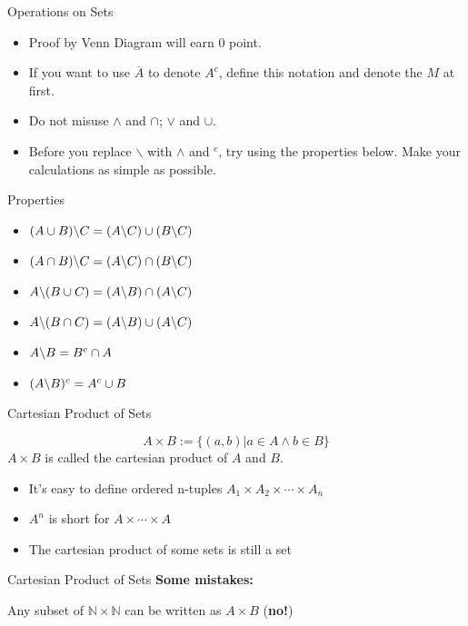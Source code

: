 \begin{frame}{Operations on Sets}
    \begin{itemize}
        \item Proof by Venn Diagram will earn 0 point.
        \item If you want to use $\overline{A}$ to denote $A^c$, define this notation and denote the $M$ at first.
        \item Do not misuse $\wedge$ and $\cap$; $\vee$ and $\cup$.
        \item Before you replace $\backslash$ with $\wedge$ and $^c$, try using the properties below. Make your calculations as simple as possible.
    \end{itemize}
    \begin{block}{Properties}
    \begin{itemize}
        \item $(A\cup B)\backslash C=(A\backslash C)\cup(B\backslash C)$
        \item $(A\cap B)\backslash C=(A\backslash C)\cap(B\backslash C)$
        \item $A\backslash (B\cup C)=(A\backslash B)\cap(A\backslash C)$
        \item $A\backslash (B\cap C)=(A\backslash B)\cup(A\backslash C)$
        \item $A\backslash B=B^c\cap A$
        \item $(A\backslash B)^c=A^c\cup B$
    \end{itemize}
    \end{block}
\end{frame}

\begin{frame}{Cartesian Product of Sets}
    \begin{definition}
        $$A\times B:=\{(a,b)|a\in A\wedge b\in B\}$$
        $A\times B$ is called the cartesian product of $A$ and $B$.
    \end{definition}
    \begin{itemize}
        \item It's easy to define ordered n-tuples $A_1\times A_2\times\cdots\times A_n$
        \item $A^n$ is short for $A\times\cdots\times A$
        \item The cartesian product of some sets is still a set
    \end{itemize}
\end{frame}

\begin{frame}{Cartesian Product of Sets}
    \textbf{Some mistakes:}
    \begin{example}
        Any subset of $\mathbb{N}\times \mathbb{N}$ can be written as $A\times B$ (\textbf{no!})
    \end{example}
\end{frame}

